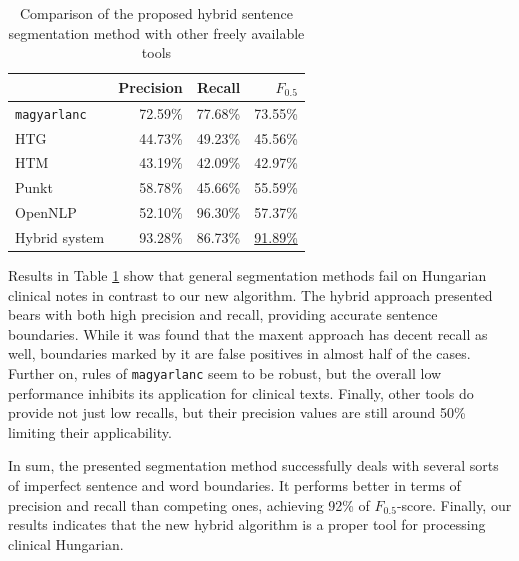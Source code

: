 \begin{table}[H]
\centering
\caption{Comparison of the proposed hybrid sentence segmentation method with other freely available tools}
\label{tab:comparison}
\begin{tabular}{ l r r r} 
\hline
& Precision & Recall & $F_{0.5}$ \\
\hline
\texttt{magyarlanc} & 72.59\% & 77.68\% & 73.55\% \\
HTG & 44.73\% & 49.23\% & 45.56\% \\
HTM & 43.19\% & 42.09\% & 42.97\% \\
Punkt & 58.78\% & 45.66\% & 55.59\%  \\
OpenNLP & 52.10\% & 96.30\% & 57.37\% \\
Hybrid system & 93.28\% & 86.73\% & \underline{91.89\%} \\
\hline
\end{tabular}
\end{table}

Results in Table \ref{tab:comparison} show that general segmentation methods fail on Hungarian clinical notes in contrast to our new algorithm. 
The hybrid approach presented bears with both high precision and recall, providing accurate sentence boundaries.
While it was found that the \acrshort{maxent} approach has decent recall as well, boundaries marked by it are false positives in almost half of the cases. 
Further on, rules of \texttt{magyarlanc} seem to be robust, but the overall low performance inhibits its application for clinical texts. 
Finally, other tools do provide not just low recalls, but their precision values are still around 50\% limiting their applicability. 

In sum, the presented segmentation method successfully deals with several sorts of imperfect sentence and word boundaries.
It performs better in terms of precision and recall than competing ones, achieving 92\% of $F_{0.5}$-score. 
Finally, our results indicates that the new hybrid algorithm is a proper tool for processing clinical Hungarian.


